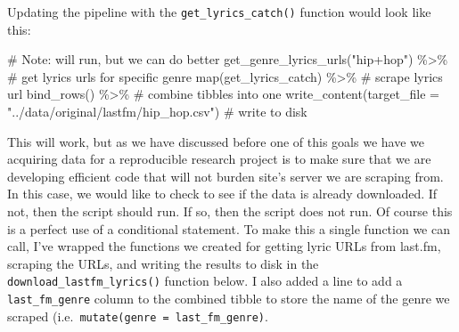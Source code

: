 \documentclass[
  letterpaper,
]{latex/krantz}
\newenvironment{Shaded}{\begin{snugshade}}{\end{snugshade}}
\newcommand{\AttributeTok}[1]{\textcolor[rgb]{0.40,0.45,0.13}{#1}}
\newcommand{\CommentTok}[1]{\textcolor[rgb]{0.37,0.37,0.37}{#1}}
\newcommand{\FunctionTok}[1]{\textcolor[rgb]{0.28,0.35,0.67}{#1}}
\newcommand{\NormalTok}[1]{\textcolor[rgb]{0.00,0.23,0.31}{#1}}
\newcommand{\SpecialCharTok}[1]{\textcolor[rgb]{0.37,0.37,0.37}{#1}}
\newcommand{\StringTok}[1]{\textcolor[rgb]{0.13,0.47,0.30}{#1}}
\begin{document}
Updating the pipeline with the \texttt{get\_lyrics\_catch()} function
would look like this:

\begin{Shaded}
\begin{Highlighting}[]
\CommentTok{\# Note: will run, but we can do better}
\FunctionTok{get\_genre\_lyrics\_urls}\NormalTok{(}\StringTok{"hip+hop"}\NormalTok{) }\SpecialCharTok{\%\textgreater{}\%} \CommentTok{\# get lyrics urls for specific genre}
  \FunctionTok{map}\NormalTok{(get\_lyrics\_catch) }\SpecialCharTok{\%\textgreater{}\%}  \CommentTok{\# scrape lyrics url}
  \FunctionTok{bind\_rows}\NormalTok{() }\SpecialCharTok{\%\textgreater{}\%} \CommentTok{\# combine tibbles into one}
  \FunctionTok{write\_content}\NormalTok{(}\AttributeTok{target\_file =} \StringTok{"../data/original/lastfm/hip\_hop.csv"}\NormalTok{) }\CommentTok{\# write to disk}
\end{Highlighting}
\end{Shaded}

This will work, but as we have discussed before one of this goals we
have we acquiring data for a reproducible research project is to make
sure that we are developing efficient code that will not burden site's
server we are scraping from. In this case, we would like to check to see
if the data is already downloaded. If not, then the script should run.
If so, then the script does not run. Of course this is a perfect use of
a conditional statement. To make this a single function we can call,
I've wrapped the functions we created for getting lyric URLs from
last.fm, scraping the URLs, and writing the results to disk in the
\texttt{download\_lastfm\_lyrics()} function below. I also added a line
to add a \texttt{last\_fm\_genre} column to the combined tibble to store
the name of the genre we scraped
(i.e.~\texttt{mutate(genre\ =\ last\_fm\_genre)}.
\end{document}
